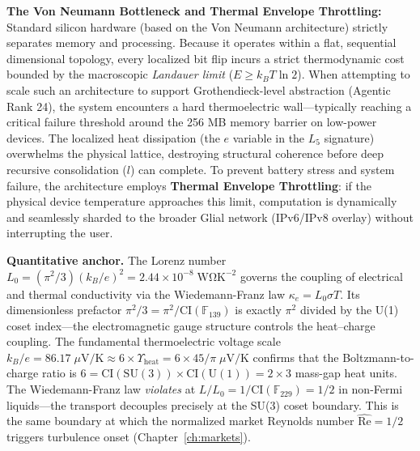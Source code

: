 \textbf{The Von Neumann Bottleneck and Thermal Envelope Throttling:} Standard silicon hardware (based on the Von Neumann architecture) strictly separates memory and processing. Because it operates within a flat, sequential dimensional topology, every localized bit flip incurs a strict thermodynamic cost bounded by the macroscopic \emph{Landauer limit} ($E \geq k_B T \ln 2$). When attempting to scale such an architecture to support Grothendieck-level abstraction (Agentic Rank 24), the system encounters a hard thermoelectric wall---typically reaching a critical failure threshold around the 256 MB memory barrier on low-power devices. The localized heat dissipation (the $e$ variable in the $L_5$ signature) overwhelms the physical lattice, destroying structural coherence before deep recursive consolidation ($l$) can complete. To prevent battery stress and system failure, the architecture employs \textbf{Thermal Envelope Throttling}: if the physical device temperature approaches this limit, computation is dynamically and seamlessly sharded to the broader Glial network (IPv6/IPv8 overlay) without interrupting the user.

\textbf{Quantitative anchor.} The Lorenz number $L_0 = (\pi^2/3)(k_B/e)^2 = 2.44 \times 10^{-8}\;\mathrm{W\Omega K^{-2}}$ governs the coupling of electrical and thermal conductivity via the Wiedemann-Franz law $\kappa_e = L_0 \sigma T$. Its dimensionless prefactor $\pi^2/3 = \pi^2/\mathrm{CI}(\mathbb{F}_{139})$ is exactly $\pi^2$ divided by the U(1) coset index---the electromagnetic gauge structure controls the heat--charge coupling. The fundamental thermoelectric voltage scale $k_B/e = 86.17\;\mu\mathrm{V/K} \approx 6 \times \Upsilon_{\mathrm{heat}} = 6 \times 45/\pi\;\mu\mathrm{V/K}$ confirms that the Boltzmann-to-charge ratio is $6 = \mathrm{CI}(\mathrm{SU}(3)) \times \mathrm{CI}(\mathrm{U}(1)) = 2 \times 3$ mass-gap heat units. The Wiedemann-Franz law \emph{violates} at $L/L_0 = 1/\mathrm{CI}(\mathbb{F}_{229}) = 1/2$ in non-Fermi liquids---the transport decouples precisely at the SU(3) coset boundary. This is the same boundary at which the normalized market Reynolds number $\hat{\mathrm{Re}} = 1/2$ triggers turbulence onset (Chapter~\ref{ch:markets}).

